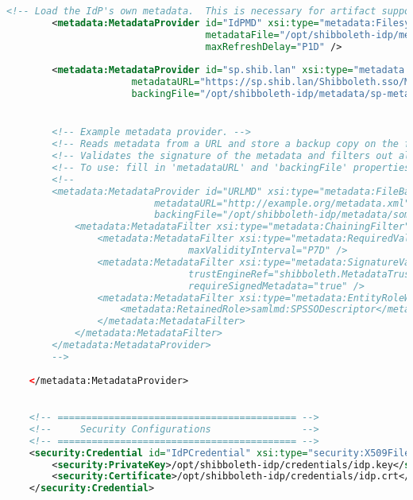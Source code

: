 \begin{lstlisting}[language=xml]
    	<!-- Load the IdP's own metadata.  This is necessary for artifact support. -->
        <metadata:MetadataProvider id="IdPMD" xsi:type="metadata:FilesystemMetadataProvider"
                                   metadataFile="/opt/shibboleth-idp/metadata/idp-metadata.xml"
                                   maxRefreshDelay="P1D" />
        
        <metadata:MetadataProvider id="sp.shib.lan" xsi:type="metadata:FileBackedHTTPMetadataProvider"
                      metadataURL="https://sp.shib.lan/Shibboleth.sso/Metadata"
                      backingFile="/opt/shibboleth-idp/metadata/sp-metadata.xml" />


        <!-- Example metadata provider. -->
        <!-- Reads metadata from a URL and store a backup copy on the file system. -->
        <!-- Validates the signature of the metadata and filters out all by SP entities in order to save memory -->
        <!-- To use: fill in 'metadataURL' and 'backingFile' properties on MetadataResource element -->
        <!--
        <metadata:MetadataProvider id="URLMD" xsi:type="metadata:FileBackedHTTPMetadataProvider"
                          metadataURL="http://example.org/metadata.xml"
                          backingFile="/opt/shibboleth-idp/metadata/some-metadata.xml">
            <metadata:MetadataFilter xsi:type="metadata:ChainingFilter">
                <metadata:MetadataFilter xsi:type="metadata:RequiredValidUntil" 
                                maxValidityInterval="P7D" />
                <metadata:MetadataFilter xsi:type="metadata:SignatureValidation"
                                trustEngineRef="shibboleth.MetadataTrustEngine"
                                requireSignedMetadata="true" />
	            <metadata:MetadataFilter xsi:type="metadata:EntityRoleWhiteList">
                    <metadata:RetainedRole>samlmd:SPSSODescriptor</metadata:RetainedRole>
                </metadata:MetadataFilter>
            </metadata:MetadataFilter>
        </metadata:MetadataProvider>
        -->
        
    </metadata:MetadataProvider>

    
    <!-- ========================================== -->
    <!--     Security Configurations                -->
    <!-- ========================================== -->
    <security:Credential id="IdPCredential" xsi:type="security:X509Filesystem">
        <security:PrivateKey>/opt/shibboleth-idp/credentials/idp.key</security:PrivateKey>
        <security:Certificate>/opt/shibboleth-idp/credentials/idp.crt</security:Certificate>
    </security:Credential>
    

\end{lstlisting}
